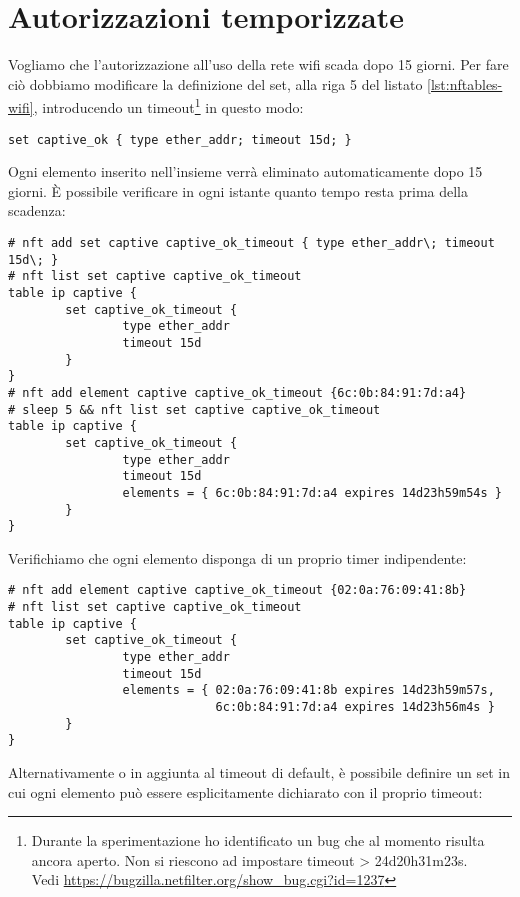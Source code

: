 \section{Autorizzazioni temporizzate}

Vogliamo che
l'autorizzazione all'uso della rete wifi scada dopo 15 giorni.  Per fare ciò
dobbiamo modificare la definizione del set, alla riga 5 del listato
\ref{lst:nftables-wifi}, introducendo un timeout\footnote{Durante la
    sperimentazione ho identificato un bug che al
    momento risulta ancora aperto. Non si riescono ad impostare timeout >
24d20h31m23s.\\Vedi \url{https://bugzilla.netfilter.org/show\_bug.cgi?id=1237}
} in questo modo:
\begin{lstlisting}[style=customc, firstnumber=5]
set captive_ok { type ether_addr; timeout 15d; }
\end{lstlisting}
Ogni elemento inserito nell'insieme verrà eliminato automaticamente dopo 15
giorni. \`E possibile verificare in ogni istante quanto tempo resta prima
della scadenza:
\begin{lstlisting}
# nft add set captive captive_ok_timeout { type ether_addr\; timeout 15d\; }
# nft list set captive captive_ok_timeout
table ip captive {
        set captive_ok_timeout {
                type ether_addr
                timeout 15d
        }
}
# nft add element captive captive_ok_timeout {6c:0b:84:91:7d:a4}
# sleep 5 && nft list set captive captive_ok_timeout
table ip captive {
        set captive_ok_timeout {
                type ether_addr
                timeout 15d
                elements = { 6c:0b:84:91:7d:a4 expires 14d23h59m54s }
        }
}
\end{lstlisting}
Verifichiamo che ogni elemento disponga di un proprio timer indipendente:
\begin{lstlisting}
# nft add element captive captive_ok_timeout {02:0a:76:09:41:8b}
# nft list set captive captive_ok_timeout
table ip captive {
        set captive_ok_timeout {
                type ether_addr
                timeout 15d
                elements = { 02:0a:76:09:41:8b expires 14d23h59m57s,
                             6c:0b:84:91:7d:a4 expires 14d23h56m4s }
        }
}
\end{lstlisting}
\newpage
\noindent Alternativamente o in aggiunta al timeout di default, è possibile definire un
set in cui ogni elemento può essere esplicitamente dichiarato con il proprio
timeout:

